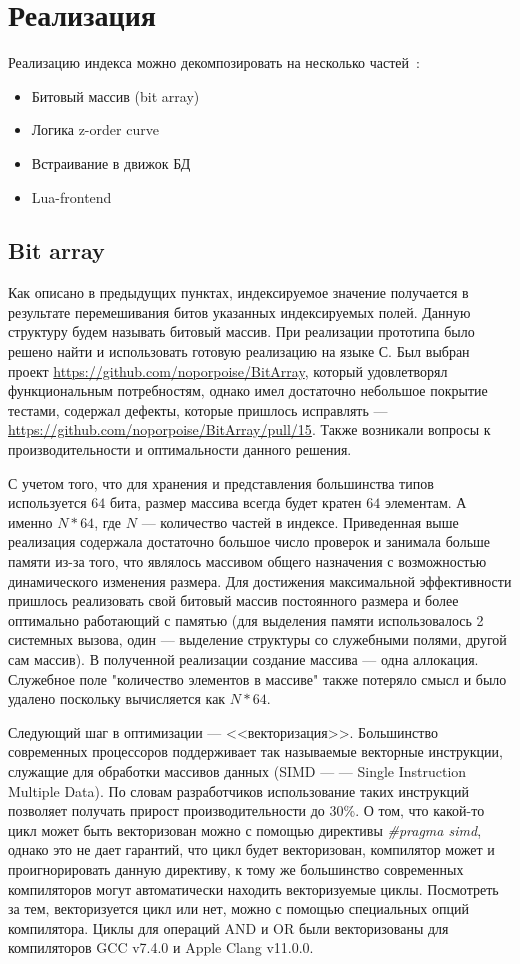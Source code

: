 \chapter{Реализация} \label{chapt3}

Реализацию индекса можно декомпозировать на несколько частей~\cite{TarantoolHowTo}:
\begin{itemize}
	\item Битовый массив (bit array)
	\item Логика z-order curve
	\item Встраивание в движок БД
	\item Lua-frontend
\end{itemize}

\section{Bit array}
Как описано в предыдущих пунктах, индексируемое значение получается
в результате перемешивания битов указанных индексируемых полей.
Данную структуру будем называть битовый массив. При реализации прототипа
было решено найти и использовать готовую реализацию на языке С.
Был выбран проект \url{https://github.com/noporpoise/BitArray},
который удовлетворял функциональным потребностям,
однако имел достаточно небольшое покрытие тестами,
содержал дефекты, которые пришлось исправлять --- \url{https://github.com/noporpoise/BitArray/pull/15}.
Также возникали вопросы к производительности и оптимальности данного решения.

С учетом того, что для хранения и представления
большинства типов используется $64$ бита, размер массива всегда будет
кратен $64$ элементам. А именно $N * 64$, где $N$ --- количество частей
в индексе. Приведенная выше реализация содержала достаточно большое
число проверок и занимала больше памяти из-за того,
что являлось массивом общего назначения с возможностью динамического
изменения размера.
Для достижения максимальной эффективности пришлось реализовать свой
битовый массив постоянного размера и более оптимально работающий с
памятью (для выделения памяти использовалось 2 системных вызова,
один --- выделение структуры со служебными полями, другой сам массив).
В полученной реализации создание массива --- одна аллокация.
Служебное поле "количество элементов в массиве" также потеряло смысл
и было удалено поскольку вычисляется как $N * 64$.

Следующий шаг в оптимизации --- <<векторизация>>.
Большинство современных процессоров поддерживает так называемые
векторные инструкции, служащие для обработки массивов данных
(SIMD --- — Single Instruction Multiple Data).
По словам разработчиков использование таких инструкций позволяет
получать прирост производительности до 30\%.
О том, что какой-то цикл может быть векторизован можно с
помощью директивы \textit{\#pragma simd},
однако это не дает гарантий, что цикл будет векторизован,
компилятор может и проигнорировать данную директиву, к тому же
большинство современных компиляторов могут автоматически находить
векторизуемые циклы.
Посмотреть за тем, векторизуется цикл или нет,
можно с помощью специальных опций компилятора.
Циклы для операций AND и OR были векторизованы для компиляторов
GCC v7.4.0 и Apple Clang v11.0.0.


